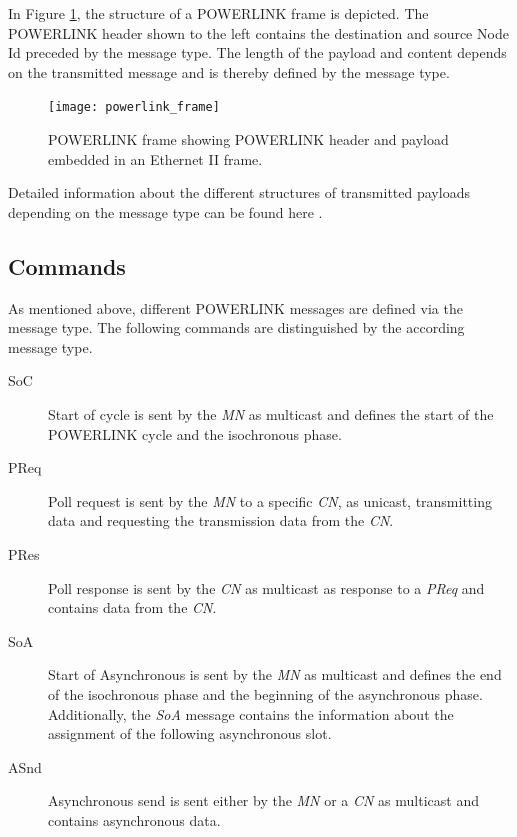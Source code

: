 In Figure \ref{fig:powerlink_frame}, the structure of a POWERLINK frame is depicted.
The POWERLINK header shown to the left contains the destination and source Node Id preceded by the message type.
The length of the payload and content depends on the transmitted message and is thereby defined by the message type. \cite[section 4.6.1.1]{epsg_epsg_2013}

\begin{figure}
    \centering
    \texttt{[image: powerlink\_frame]}
    \caption{POWERLINK frame showing POWERLINK header and payload embedded in an Ethernet II frame.}
    \label{fig:powerlink_frame}
\end{figure}

Detailed information about the different structures of transmitted payloads depending on the message type can be found here \cite[section 4.6.1.1.1]{epsg_epsg_2013}.

\subsection{Commands}
\label{sec:oplk_powerlink_commands}

As mentioned above, different POWERLINK messages are defined via the message type.
The following commands are distinguished by the according message type.

\begin{description}
    \item[SoC] Start of cycle is sent by the \emph{MN} as multicast and defines the start of the POWERLINK cycle and the isochronous phase.
    \item[PReq] Poll request is sent by the \emph{MN} to a specific \emph{CN}, as unicast, transmitting data and requesting the transmission data from the \emph{CN}.
    \item[PRes] Poll response is sent by the \emph{CN} as multicast as response to a \emph{PReq} and contains data from the \emph{CN}.
    \item[SoA] Start of Asynchronous is sent by the \emph{MN} as multicast and defines the end of the isochronous phase and the beginning of the asynchronous phase.
    Additionally, the \emph{SoA} message contains the information about the assignment of the following asynchronous slot.
    \item[ASnd] Asynchronous send is sent either by the \emph{MN} or a \emph{CN} as multicast and contains asynchronous data.
\end{description}

